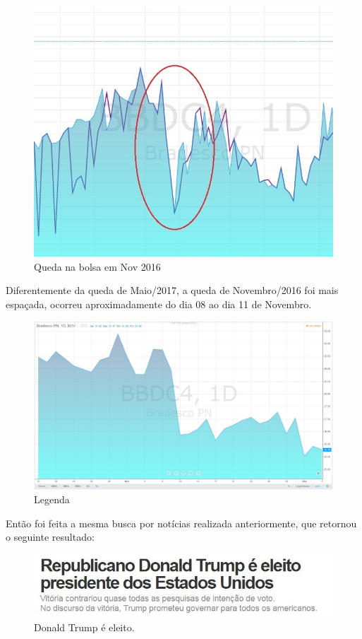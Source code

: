 \documentclass{sigchi}
\begin{document}
\begin{figure}[!htb]
\centering
\includegraphics[scale=0.85]{./figures/queda-2016.jpg}
\caption{Queda na bolsa em Nov 2016}
\label{fig3}
\end{figure}
Diferentemente da queda de Maio/2017, a queda de Novembro/2016 foi mais espaçada, ocorreu aproximadamente do dia 08 ao dia 11 de Novembro.

\begin{figure}[!htb]
	\centering
	\includegraphics[scale=0.5]{./figures/figura6.jpg}
	\caption{Legenda}
	\label{figRotu}
\end{figure}
Então foi feita a mesma busca por notícias realizada anteriormente, que retornou o seguinte resultado: 
\begin{figure}[!htb]
	\centering
	\includegraphics[scale=0.4]{./figures/figura7.jpg}
\caption{Donald Trump é eleito.}
	\label{figRotu}
\end{figure}
\end{document}
